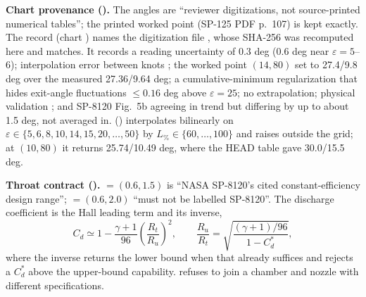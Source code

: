 \textbf{Chart provenance ().} The angles are ``reviewer digitizations, not
source-printed numerical tables''; the printed worked point (SP-125 PDF p.~107) is kept exactly. The
 record (chart ) names the digitization file
, whose SHA-256 was
recomputed here and matches. It records a reading uncertainty of 0.3 deg (0.6 deg near
$\varepsilon = 5$--$6$); interpolation error between knots ; the worked point $(14, 80)$
set to 27.4/9.8 deg over the measured 27.36/9.64 deg; a cumulative-minimum regularization that hides exit-angle
fluctuations $\le 0.16$ deg above $\varepsilon = 25$; no extrapolation; physical validation
; and SP-8120 Fig.~5b agreeing in trend but differing by up to about 1.5 deg, not averaged
in.  () interpolates bilinearly on $\varepsilon\in\{5,6,8,10,14,15,20,\dots,50\}$
by $L_\%\in\{60,\dots,100\}$ and raises outside the grid; at $(10, 80)$ it returns 25.74/10.49 deg, where the HEAD
table gave 30.0/15.5 deg.

\textbf{Throat contract ().}  $= (0.6, 1.5)$
is ``NASA SP-8120's cited constant-efficiency design range''; 
$= (0.6, 2.0)$ ``must not be labelled SP-8120''. The discharge coefficient is the Hall leading term and its
inverse,
\begin{equation}
C_d \simeq 1 - \frac{\gamma+1}{96}\left(\frac{R_t}{R_u}\right)^{2},\qquad
\frac{R_u}{R_t} = \sqrt{\frac{(\gamma+1)/96}{1-C_d^{*}}},
\end{equation}
where the inverse returns the lower bound when that already suffices and rejects a $C_d^*$ above the upper-bound
capability.  refuses to join a chamber and nozzle with different specifications.

